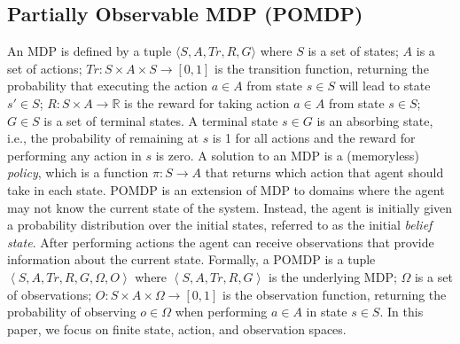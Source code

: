 \documentclass[letterpaper]{article} %
\newcommand{\tuple}[1]{\ensuremath{\left \langle #1 \right \rangle }}
\newcommand{\guy}[1]{\textcolor{blue}{[Guy: #1]}}
\newcommand{\inon}[1]{ }
\begin{document}
\subsection{Partially Observable MDP (POMDP)}
An MDP is defined by a tuple $\langle{S, A, Tr, R, G}\rangle$ where 
 $S$ is a set of states; 
 $A$ is a set of actions; 
 $Tr: S \times A \times S \rightarrow [0,1]$ is the transition function, returning the probability that executing the action $a \in A$ from state $s \in S$ will lead to state $s' \in S$;
$R: S \times A \rightarrow \mathbb{R} $ is the reward for taking action $a \in A$ from state $s \in S$;
$G \in S$ is a set of terminal states. 
A terminal state $s\in G$ is an absorbing state, i.e., 
the probability of remaining at $s$ is 1 for all actions 
and the reward for performing any action in $s$ is zero. 
A solution to an MDP is a (memoryless) \emph{policy}, which is a function $\pi: S \rightarrow A$ that returns which action that agent should take in each state. 
POMDP is an extension of MDP to domains where the agent may not know the current state of the system. 
Instead, the agent is initially given a probability distribution over the initial states, referred to as the initial \emph{belief state}. After performing actions the agent can receive observations that provide information about the current state. 
Formally, a POMDP is a tuple $\tuple{S,A,Tr,R,G,\Omega,O}$ where 
$\tuple{S,A,Tr,R,G}$ is the underlying MDP;
$\Omega$ is a set of observations;
$O:S\times A\times\Omega\rightarrow [0,1]$ is the observation function, returning the probability of observing $o\in\Omega$ when performing $a\in A$ in state $s\in S$. 
In this paper, we focus on finite state, action, and observation spaces. %
\end{document}
